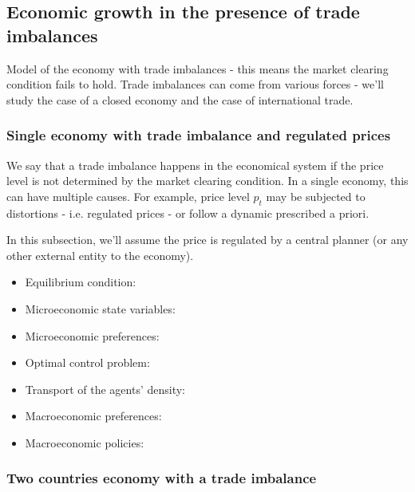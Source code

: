 \documentclass{article}
\begin{document}
\subsection{Economic growth in the presence of trade imbalances}

    Model of the economy with trade imbalances - this means the market clearing condition fails to hold.
    Trade imbalances can come from various forces - we'll study the case of a closed economy and
    the case of international trade.

\subsubsection{Single economy with trade imbalance and regulated prices}

    We say that a trade imbalance happens in the economical system if the price level is not determined
    by the market clearing condition. In a single economy, this can have multiple causes. 
    For example, price level $p_t$ may be subjected to distortions - i.e. regulated prices - or
    follow a dynamic prescribed a priori.

    In this subsection, we'll assume the price is regulated by a central planner (or any other 
    external entity to the economy).

\begin{itemize}
    \item Equilibrium condition:
    \item Microeconomic state variables:
    \item Microeconomic preferences:
    \item Optimal control problem:
    \item Transport of the agents' density:
    \item Macroeconomic preferences:
    \item Macroeconomic policies:
\end{itemize}

\subsubsection{Two countries economy with a trade imbalance}
\end{document}
